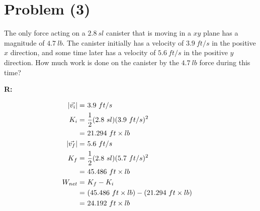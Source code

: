 \section{Problem (3)}

	The only force acting on a $2.8 \ sl$ canister that is moving in a $xy$ plane has a magnitude of $4.7 \ lb$. The canister initially has a velocity of $3.9 \ ft/s$ in the positive $x$ direction, and some time later has a velocity of $5.6 \ ft/s$ in the positive $y$ direction. How much work is done on the canister by the $4.7 \ lb$ force during this time?

	\textbf{R:}

	\begin{align}
		\left|\vec{v_{i}}\right| = \ &3.9 \ ft/s& \notag \\
		K_{i} = \ &\frac{1}{2}(2.8 \ sl)(3.9 \ ft/s)^{2}& \notag \\
		= \ &21.294 \ ft \times lb& \notag \\
		\left|\vec{v_{f}}\right| = \ &5.6 \ ft/s& \notag \\
		K_{f} = \ &\frac{1}{2}(2.8 \ sl)(5.7 \ ft/s)^{2}& \notag \\
		= \ &45.486 \ ft \times lb& \notag \\
		W_{net} = \ &K_{f} - K_{i}& \notag \\
		= \ &(45.486 \ ft \times lb) - (21.294 \ ft \times lb)& \notag \\
		= \ &24.192 \ ft \times lb&
	\end{align}
